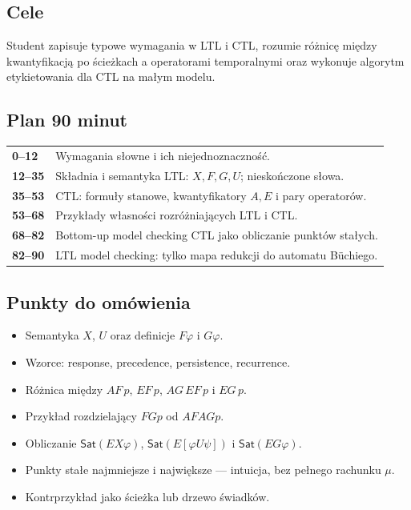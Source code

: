 \documentclass[11pt,a4paper]{article}
\begin{document}
\subsection{Cele}
Student zapisuje typowe wymagania w LTL i CTL, rozumie różnicę między kwantyfikacją po ścieżkach a operatorami temporalnymi oraz wykonuje algorytm etykietowania dla CTL na małym modelu.

\subsection{Plan 90 minut}
\begin{center}\small\begin{tabularx}{0.96\textwidth}{@{}>{\bfseries}p{18mm}X@{}}
0--12 & Wymagania słowne i ich niejednoznaczność.\\
12--35 & Składnia i semantyka LTL: $X,F,G,U$; nieskończone słowa.\\
35--53 & CTL: formuły stanowe, kwantyfikatory $A,E$ i pary operatorów.\\
53--68 & Przykłady własności rozróżniających LTL i CTL.\\
68--82 & Bottom-up model checking CTL jako obliczanie punktów stałych.\\
82--90 & LTL model checking: tylko mapa redukcji do automatu Büchiego.\\
\end{tabularx}\end{center}

\subsection{Punkty do omówienia}
\begin{itemize}
\item Semantyka $X$, $U$ oraz definicje $F\varphi$ i $G\varphi$.
\item Wzorce: response, precedence, persistence, recurrence.
\item Różnica między $AF\,p$, $EF\,p$, $AG\,EF\,p$ i $EG\,p$.
\item Przykład rozdzielający $FGp$ od $AFAGp$.
\item Obliczanie $\mathsf{Sat}(EX\varphi)$, $\mathsf{Sat}(E[\varphi U\psi])$ i $\mathsf{Sat}(EG\varphi)$.
\item Punkty stałe najmniejsze i największe --- intuicja, bez pełnego rachunku $\mu$.
\item Kontrprzykład jako ścieżka lub drzewo świadków.
\end{itemize}
\end{document}
